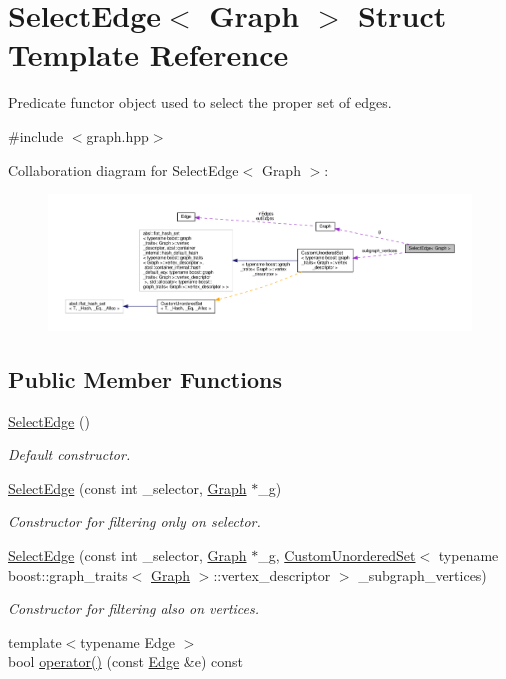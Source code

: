 \hypertarget{structSelectEdge}{}\section{Select\+Edge$<$ Graph $>$ Struct Template Reference}
\label{structSelectEdge}


Predicate functor object used to select the proper set of edges.  




{\ttfamily \#include $<$graph.\+hpp$>$}



Collaboration diagram for Select\+Edge$<$ Graph $>$\+:
\nopagebreak
\begin{figure}[H]
\begin{center}
\leavevmode
\includegraphics[width=350pt]{d3/d16/structSelectEdge__coll__graph}
\end{center}
\end{figure}
\subsection*{Public Member Functions}
\begin{DoxyCompactItemize}
\item 
\hyperlink{structSelectEdge_a85fd1ba13a38152310e167ed546281de}{Select\+Edge} ()
\begin{DoxyCompactList}\small\item\em Default constructor. \end{DoxyCompactList}\item 
\hyperlink{structSelectEdge_a55138a44b9aff43a9fd253c4618cb1b2}{Select\+Edge} (const int \+\_\+selector, \hyperlink{structGraph}{Graph} $\ast$\+\_\+g)
\begin{DoxyCompactList}\small\item\em Constructor for filtering only on selector. \end{DoxyCompactList}\item 
\hyperlink{structSelectEdge_aebf96eb92b7320c359d7d17b4ac4e590}{Select\+Edge} (const int \+\_\+selector, \hyperlink{structGraph}{Graph} $\ast$\+\_\+g, \hyperlink{classCustomUnorderedSet}{Custom\+Unordered\+Set}$<$ typename boost\+::graph\+\_\+traits$<$ \hyperlink{structGraph}{Graph} $>$\+::vertex\+\_\+descriptor $>$ \+\_\+subgraph\+\_\+vertices)
\begin{DoxyCompactList}\small\item\em Constructor for filtering also on vertices. \end{DoxyCompactList}\item 
{\footnotesize template$<$typename Edge $>$ }\\bool \hyperlink{structSelectEdge_ae235c3ec03feff8a290f8edd593341a1}{operator()} (const \hyperlink{structEdge}{Edge} \&e) const
\end{DoxyCompactItemize}
